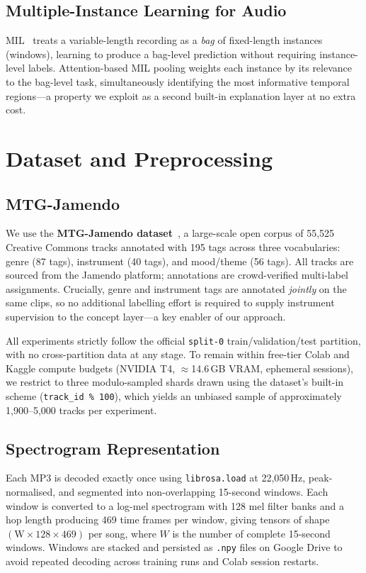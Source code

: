 \documentclass[sigconf,nonacm]{acmart}
\begin{document}
\subsection{Multiple-Instance Learning for Audio}

MIL~\cite{ilse2018mil} treats a variable-length recording as a \emph{bag} of fixed-length
instances (windows), learning to produce a bag-level prediction without requiring instance-level
labels. Attention-based MIL pooling weights each instance by its relevance to the bag-level
task, simultaneously identifying the most informative temporal regions---a property we exploit
as a second built-in explanation layer at no extra cost.

\section{Dataset and Preprocessing}

\subsection{MTG-Jamendo}

We use the \textbf{MTG-Jamendo dataset}~\cite{bogdanov2019mtg}, a large-scale open corpus of
55,525 Creative Commons tracks annotated with 195 tags across three vocabularies: genre (87 tags),
instrument (40 tags), and mood/theme (56 tags). All tracks are sourced from the Jamendo platform;
annotations are crowd-verified multi-label assignments. Crucially, genre and instrument tags are
annotated \emph{jointly} on the same clips, so no additional labelling effort is required to
supply instrument supervision to the concept layer---a key enabler of our approach.

All experiments strictly follow the official \texttt{split-0} train/validation/test partition,
with no cross-partition data at any stage. To remain within free-tier Colab and Kaggle compute
budgets (NVIDIA T4, $\approx$14.6\,GB VRAM, ephemeral sessions), we restrict to three
modulo-sampled shards drawn using the dataset's built-in scheme (\texttt{track\_id\,\%\,100}),
which yields an unbiased sample of approximately 1,900--5,000 tracks per experiment.

\subsection{Spectrogram Representation}

Each MP3 is decoded exactly once using \texttt{librosa.load} at 22,050\,Hz, peak-normalised,
and segmented into non-overlapping 15-second windows. Each window is converted to a log-mel
spectrogram with 128 mel filter banks and a hop length producing 469 time frames per window,
giving tensors of shape $(\text{W}\times128\times469)$ per song, where $W$ is the number of
complete 15-second windows. Windows are stacked and persisted as \texttt{.npy} files on Google
Drive to avoid repeated decoding across training runs and Colab session restarts.
\end{document}
